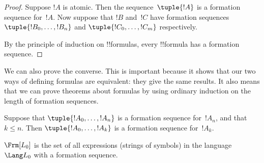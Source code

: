 \documentclass[../../../include/open-logic-section]{subfiles}
\begin{document}
\begin{proof}
Suppose $!A$ is atomic. Then the sequence~$\tuple{!A}$ is a
formation sequence for~$!A$.
%
Now suppose that $!B$ and~$!C$ have formation sequences
$\tuple{!B_0,\dotsc,!B_n}$ and $\tuple{!C_0,\dotsc,!C_m}$
respectively.
%
\begin{enumerate}
\end{enumerate}
By the principle of induction on !!{formula}s,
every !!{formula} has a formation sequence.
\end{proof}

We can also prove the converse. This is important because it shows
that our two ways of defining formulas are equivalent: they give
the same results. It also means that we can prove theorems about
formulas by using ordinary induction on the length of formation
sequences.

\begin{lem}
Suppose that $\tuple{!A_0,\dotsc,!A_n}$ is a formation sequence
for~$!A_n$, and that $k \leq n$. Then $\tuple{!A_0,\dotsc,!A_k}$
is a formation sequence for~$!A_k$.
\end{lem}

\begin{thm}
$\Frm[L_0]$ is the set of all expressions (strings of symbols)
in the language~$\Lang L_0$ with a formation sequence.
\end{thm}
\end{document}
